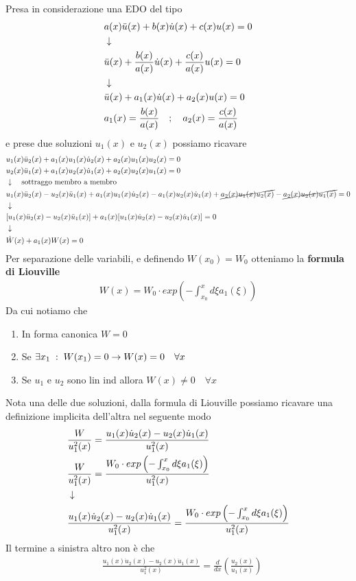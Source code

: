 Presa in considerazione una EDO del tipo
\begin{align}
	&a(x) \ddot{u}(x) + b(x) \dot{u}(x) + c(x) u(x) = 0 \\ &\downarrow \nonumber \\
	&\ddot{u}(x) + \frac{b(x)}{a(x)} \dot{u}(x) + \frac{c(x)}{a(x)} u(x) = 0\nonumber \\ &\downarrow \nonumber \\
	&\ddot{u}(x) + a_1(x) \dot{u}(x) + a_2(x) u(x) = 0 \\
	&a_1(x) =  \frac{b(x)}{a(x)} \quad ; \quad a_2(x)=\frac{c(x)}{a(x)}
\end{align}
e prese due soluzioni $u_1(x)$ e $u_2(x)$ possiamo ricavare
\begin{align}
	&u_1(x)\ddot{u}_2(x) + a_1(x) u_1(x)\dot{u}_2(x) + a_2(x) u_1(x)u_2(x) = 0 \\
	&u_2(x)\ddot{u}_1(x) + a_1(x) u_2(x)\dot{u}_1(x) + a_2(x) u_2(x)u_1(x) = 0\\ &\downarrow \quad \text{sottraggo membro a membro} \nonumber \\
	&u_1(x)\ddot{u}_2(x) - u_2(x)\ddot{u}_1(x) + a_1(x) u_1(x)\dot{u}_2(x) - a_1(x) u_2(x)\dot{u}_1(x) + \cancel{ a_2(x) u_1(x)u_2(x)} - \cancel{a_2(x) u_2(x)u_1(x)} = 0 \nonumber \\ &\downarrow \nonumber \\
	&[u_1(x)\ddot{u}_2(x) - u_2(x)\ddot{u}_1(x)]+ a_1(x) [  u_1(x)\dot{u}_2(x) - u_2(x)\dot{u}_1(x)] = 0\nonumber \\ &\downarrow \nonumber \\
	&\dot{W}(x) + a_1(x)W(x) = 0
\end{align}
Per separazione delle variabili, e definendo $W(x_0)=W_0$ otteniamo la \textbf{formula di Liouville}
\begin{align}
	W(x) = W_0\cdot exp\left( -\int_{x_0}^{x} d\xi a_1(\xi) \right)
\end{align}
Da cui notiamo che
\begin{enumerate}
	\item In forma canonica $W=0$
	\item Se $\exists x_1 \; : \; W(x_1) = 0 \to W(x) = 0\quad\forall x$
	\item Se $u_1$ e $u_2$ sono lin ind allora $W(x) \neq 0 \quad \forall x$
\end{enumerate}
Nota una delle due soluzioni, dalla formula di Liouville possiamo ricavare una definizione implicita dell'altra nel seguente modo
\begin{align}
	&\frac{W}{u_1^2(x)} = \frac{u_1(x)\dot{u}_2(x) - u_2(x)\dot{u}_1(x)}{u_1^2(x)}\\
	&\frac{W}{u_1^2(x)} = \frac{W_0\cdot exp\left( -\int_{x_0}^{x} d\xi a_1(\xi) \right)}{u_1^2(x)} \\ &\downarrow \nonumber \\
	&\frac{u_1(x)\dot{u}_2(x) - u_2(x)\dot{u}_1(x)}{u_1^2(x)} = \frac{W_0\cdot exp\left( -\int_{x_0}^{x} d\xi a_1(\xi) \right)}{u_1^2(x)}
\end{align}
Il termine a sinistra altro non è che 
\begin{align}
	&\frac{u_1(x)\dot{u}_2(x) - u_2(x)\dot{u}_1(x)}{u_1^2(x)} = \frac{d}{dx} \left( \frac{u_2(x)}{u_1(x)} \right)
\end{align}
